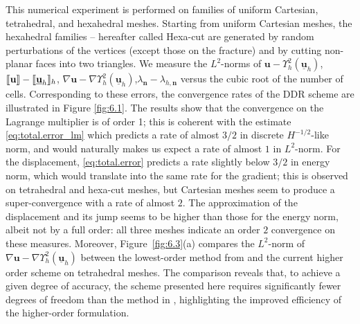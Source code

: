 \documentclass[a4paper,11pt]{article}
\theoremstyle{definition}
\theoremstyle{remark}
\newcommand{\uvec}[1]{\underline{\mathbf{#1}}}
\newcommand{\bo}[1]{\mathbf{#1}}
\newcommand{\up}[1]{\Upsilon^2_{#1}}
\def\sjump#1{[\hskip -1.5pt[#1]\hskip -1.5pt]}
\begin{document}
This numerical experiment is performed on families of uniform Cartesian, tetrahedral, and hexahedral meshes. Starting from uniform Cartesian meshes, the hexahedral families -- hereafter called Hexa-cut are generated by random perturbations of the vertices (except those on the fracture) and by cutting non-planar faces into two triangles. We measure the $L^2$-norms of $\bo{u}-\up{h}(\uvec{u}_h)$, $\sjump{\bo{u}}-\sjump{\uvec{u}_h}_h$, $\nabla\bo{u}-\nabla\up{h}({\uvec{u}_h})$,$\lambda_{\bo{n}}-\lambda_{h,\bo{n}}$ versus the cubic root of the number of cells. Corresponding to these errors, the convergence rates of the DDR scheme are illustrated in Figure \ref{fig:6.1}. The results show that the convergence on the Lagrange multiplier is of order 1; this is coherent with the estimate \eqref{eq:total.error_lm} which predicts a rate of almost $3/2$ in discrete $H^{-1/2}$-like norm, and would naturally makes us expect a rate of almost $1$ in $L^2$-norm. For the displacement, \eqref{eq:total.error} predicts a rate slightly below $3/2$ in energy norm, which would translate into the same rate for the gradient; this is observed on tetrahedral and hexa-cut meshes, but Cartesian meshes seem to produce a super-convergence with a rate of almost $2$. The approximation of the displacement and its jump seems to be higher than those for the energy norm, albeit not by a full order: all three meshes indicate an order $2$ convergence on these measures.
Moreover, Figure~\ref{fig:6.3}(a) compares the $L^2$-norm of $\nabla\bo{u}-\nabla\up{h}(\uvec{u}_h)$ between the lowest-order method from \cite{jhr} and the current higher order scheme on tetrahedral meshes. The comparison reveals that, to achieve a given degree of accuracy, the scheme presented here requires significantly fewer degrees of freedom than the method in \cite{jhr}, highlighting the improved efficiency of the higher-order formulation.
\end{document}
